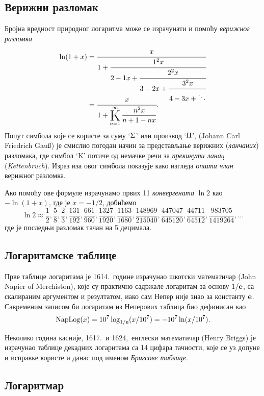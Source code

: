\subsection{Верижни разломак}

Бројна вредност природног логаритма може се израчунати и помоћу {\sl верижног разломка}
\begin{equation}\label{eq:verige}
\begin{aligned}
\ln(1+x)
&=\cfrac{x}{1+\cfrac{1^2x}{2-1x+\cfrac{2^2x}{3-2x+\cfrac{3^2x}{4-3x+\ddots}}}}\\
\noalign{\vskip-12pt}
&=\cfrac{x}{1+ \Kinf{\n^2x}{\n+1-\n x}}.
\end{aligned}
\end{equation}
Попут симбола које се користе за суму `$\rm\Sigma$' или производ `$\rm\Pi$', 
 (Johann Carl Friedrich Gau\ss) је смислио погодан начин за представљање
верижних ({\sl ланчаних\/}) разломака,
где симбол `K' потиче од немачке речи за {\sl прекинути ланац\/} ({\sl Kettenbruch\/}).
Израз иза овог симбола показује како изгледа {\sl општи члан\/} верижног разломка.

\def\ff#1/#2,{\frac{#1}{#2},}
Ако помоћу ове формуле израчунамо првих 11 {\sl конвергената\/} $\ln2$ као $-\ln(1+x)$, 
где је $x=-1/2$,
добићемо
$$
\ln2\approx\ff1/2, \ff5/8, \ff2/3, \ff131/192, \ff661/960, \ff1327/1920, \ff1163/1680, \ff148969/215040, 
\ff447047/645120, \ff44711/64512, \ff983705/1419264, \dots
$$
где је последњи разломак тачан на 5 децимала.


\subsection{Логаритамске таблице}

Прве таблице логаритама је 1614.\ године 
израчунао шкотски математичар  (John Napier of Merchiston),
које су практично садржале логаритам за основу $1/{\bf e}$, 
са скалираним аргументом и резултатом,
иако сам Непер није знао за константу ${\bf e}$.
Савременим записом би логаритам из Неперових таблица био дефинисан као
$$
\mathop{\rm NapLog}\nolimits (x) = 10^7\log_{1/{\bf e}}(x/10^7) = -10^7\ln(x/10^7).
$$

Неколико година касније, 1617.\ и 1624,\ 
енглески математичар  (Henry Briggs) је израчунао
таблице декадних логаритама са 14 цифара тачности, које се уз допуне и исправке
користе и данас под именом {\sl Бригсове таблице}.


\subsection{Логаритмар}

